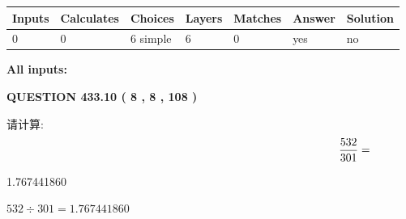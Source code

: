 \documentclass{ctexart}
\begin{document}
 
\noindent{}
 
 
   
   
   
   
\noindent\begin{tabular}{|l|l|l|l|l|l|l|}
 \hline
Inputs & Calculates & Choices & Layers & Matches & Answer & Solution \\ \hline
 0  & 
 0  & 
 6
  simple  
  & 
 6  & 
 0  & 
  yes & 
  no 
  \\ \hline
 \end{tabular}
   
   
   
   
\noindent{}
   
   
   
   
\noindent\vspace{0.1in}\hspace{-0.08in} {\textbf{\Large{All inputs: }}}
   
   
  
\vspace{0.2in}
  
{\textbf{\Large{QUESTION
433.10 
 ( 8 , 8 , 108 )
}}}
  
  
 
请计算:
\begin{equation}
\frac { %
532 }  {  %
301} = \nonumber
\end{equation}
 
 
 
\noindent{}
 
 

1.767441860
 
 
\noindent{}
 
 

 
 
 
\noindent{}
 
 

$ %
532 \div  %
301=   %
1.767441860$
 
 
\noindent{}
 
 

 
   
\end{document}
